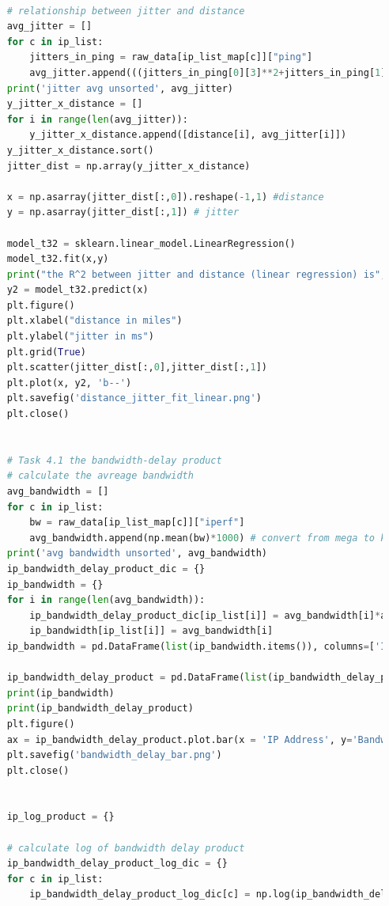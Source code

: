 \documentclass[paper=a4, fontsize=10pt]{scrartcl} %
\numberwithin{equation}{section} %
\numberwithin{figure}{section} %
\numberwithin{table}{section} %
\begin{document}
\begin{lstlisting}[language = python]
    
    # relationship between jitter and distance
    avg_jitter = []
    for c in ip_list:
        jitters_in_ping = raw_data[ip_list_map[c]]["ping"]
        avg_jitter.append(((jitters_in_ping[0][3]**2+jitters_in_ping[1][3]**2+jitters_in_ping[2][3]**2)/3)**(1/2))
    print('jitter avg unsorted', avg_jitter)
    y_jitter_x_distance = []
    for i in range(len(avg_jitter)):
        y_jitter_x_distance.append([distance[i], avg_jitter[i]])
    y_jitter_x_distance.sort()
    jitter_dist = np.array(y_jitter_x_distance)
    
    x = np.asarray(jitter_dist[:,0]).reshape(-1,1) #distance
    y = np.asarray(jitter_dist[:,1]) # jitter
    
    model_t32 = sklearn.linear_model.LinearRegression()
    model_t32.fit(x,y)
    print("the R^2 between jitter and distance (linear regression) is",model_t32.score(x,y))
    y2 = model_t32.predict(x)
    plt.figure()
    plt.xlabel("distance in miles")
    plt.ylabel("jitter in ms")
    plt.grid(True)
    plt.scatter(jitter_dist[:,0],jitter_dist[:,1])
    plt.plot(x, y2, 'b--')
    plt.savefig('distance_jitter_fit_linear.png')
    plt.close()
    
    
    # Task 4.1 the bandwidth-delay product
    # calculate the avreage bandwidth
    avg_bandwidth = []
    for c in ip_list:
        bw = raw_data[ip_list_map[c]]["iperf"]
        avg_bandwidth.append(np.mean(bw)*1000) # convert from mega to kilo
    print('avg bandwidth unsorted', avg_bandwidth)
    ip_bandwidth_delay_product_dic = {}
    ip_bandwidth = {}
    for i in range(len(avg_bandwidth)):
        ip_bandwidth_delay_product_dic[ip_list[i]] = avg_bandwidth[i]*avg_delay[i]/1000 #convert ms to second
        ip_bandwidth[ip_list[i]] = avg_bandwidth[i]
    ip_bandwidth = pd.DataFrame(list(ip_bandwidth.items()), columns=['IP Address', 'Bandwidth in kbps'])
    
    ip_bandwidth_delay_product = pd.DataFrame(list(ip_bandwidth_delay_product_dic.items()),columns=['IP Address', 'Bandwidth Delay Product(kbps)'])
    print(ip_bandwidth)
    print(ip_bandwidth_delay_product)
    plt.figure()
    ax = ip_bandwidth_delay_product.plot.bar(x = 'IP Address', y='Bandwidth Delay Product(kbps)', fontsize=6, figsize=(15, 15))
    plt.savefig('bandwidth_delay_bar.png')
    plt.close()
    
    
    ip_log_product = {}
    
    # calculate log of bandwidth delay product
    ip_bandwidth_delay_product_log_dic = {}
    for c in ip_list:
        ip_bandwidth_delay_product_log_dic[c] = np.log(ip_bandwidth_delay_product_dic[c])
    

\end{lstlisting}
\end{document}
